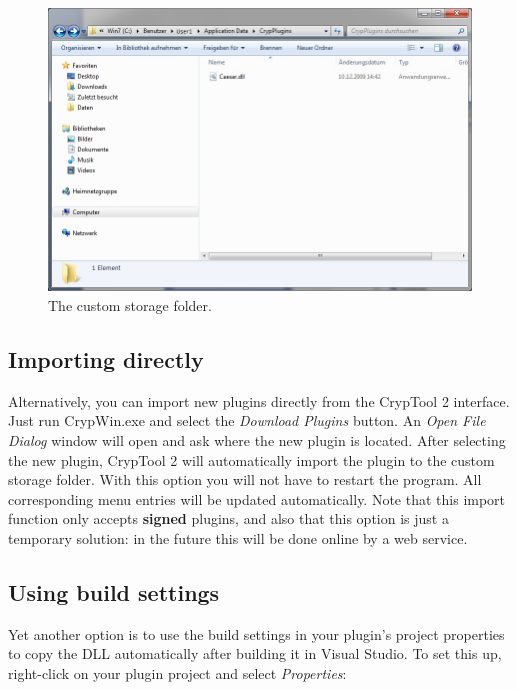 \begin{figure}[h]
	\centering
		\includegraphics[width=1.00\textwidth]{figures/custom_storage.jpg}
	\caption{The custom storage folder.}
	\label{fig:custom_storage}
\end{figure}

\subsection{Importing directly}
\label{sec:ImportingDirectly}

Alternatively, you can import new plugins directly from the CrypTool 2 interface. Just run \mbox{CrypWin.exe} and select the \textit{Download Plugins} button. An \textit{Open File Dialog} window will open and ask where the new plugin is located. After selecting the new plugin, CrypTool 2 will automatically import the plugin to the custom storage folder. With this option you will not have to restart the program. All corresponding menu entries will be updated automatically. Note that this import function only accepts \textbf{signed} plugins, and also that this option is just a temporary solution: in the future this will be done online by a web service.
\clearpage

\subsection{Using build settings}
\label{sec:UsingBuildSettings}

Yet another option is to use the build settings in your plugin's project properties to copy the DLL automatically after building it in Visual Studio. To set this up, right-click on your plugin project and select \textit{Properties}:

